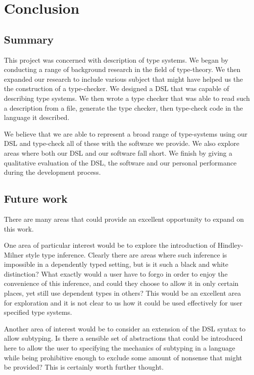 \chapter{Conclusion}

\section{Summary}

This project was concerned with description of type systems. We began
by conducting a range of background research in the field of
type-theory. We then expanded our research to include various subject
that might have helped us the the construction of a type-checker. We
designed a DSL that was capable of describing type systems. We then
wrote a type checker that was able to read such a description from a 
file, generate the type checker, then type-check code in the language it
described.

We believe that we are able to represent a broad range of
type-systems using our DSL and type-check all of these with the software we
provide. We also explore areas where both our DSL and our software
fall short. We finish by giving a qualitative evaluation of the DSL,
the software and our personal performance during the development
process. 

\section{Future work}

There are many areas that could provide an excellent opportunity to
expand on this work.

One area of particular interest would be to explore the introduction
of Hindley-Milner style type inference. Clearly there are areas where
such inference is impossible in a dependently typed setting, but is it
such a black and white distinction? What exactly would a user have to
forgo in order to enjoy the convenience of this inference, and could
they choose to allow it in only certain places, yet still use
dependent types in others? This would be an excellent area for
exploration and it is not clear to us how it could be used effectively
for user specified type systems.

Another area of interest would be to consider an extension of the DSL
syntax to allow subtyping. Is there a sensible set of abstractions
that could be introduced here to allow the user to specifying the
mechanics of subtyping in a language while being prohibitive enough to
exclude some amount of nonsense that might be provided? This is
certainly worth further thought.

